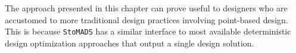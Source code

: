 The approach presented in this chapter can prove useful to designers who are accustomed to more traditional design practices involving point-based design. This is because \texttt{StoMADS} has a similar interface to most available deterministic design optimization approaches that output a single design solution.
